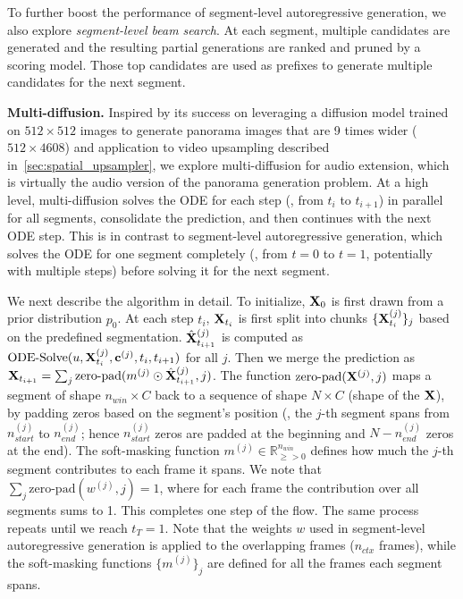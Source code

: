 To further boost the performance of segment-level autoregressive generation, we also explore \textit{segment-level beam search}.
At each segment, multiple candidates are generated and the resulting partial generations are ranked and pruned by a scoring model.
Those top candidates are used as prefixes to generate multiple candidates for the next segment.


\textbf{Multi-diffusion.}
Inspired by its success on leveraging a diffusion model trained on $512 \times 512$ images to generate panorama images that are 9 times wider ($512 \times 4608$) and application to video upsampling described in~\cref{sec:spatial_upsampler},
we explore multi-diffusion for audio extension, which is virtually the audio version of the panorama generation problem.
At a high level, multi-diffusion solves the ODE for each step (\eg, from $t_i$ to $t_{i+1}$) in parallel for all segments,
consolidate the prediction, and then continues with the next ODE step.
This is in contrast to segment-level autoregressive generation,
which solves the ODE for one segment completely (\ie, from $t=0$ to $t=1$, potentially with multiple steps) before solving it for the next segment.

We next describe the algorithm in detail.
To initialize, $\mathbf{X}_0$ is first drawn from a prior distribution $p_0$.
At each step $t_i$, $\mathbf{X}_{t_i}$ is first split into chunks $\{\mathbf{X}_{t_i}^{(j)}\}_j$ based on the predefined segmentation.
$\hat{\mathbf{X}}_{t_{i+1}}^{(j)}$ is computed as $\text{ODE-Solve}(u, \mathbf{X}_{t_i}^{(j)}, \mathbf{c}^{(j)}, t_i, t_{i+1})$ for all $j$.
Then we merge the prediction as $\mathbf{X}_{t_{i+1}} = \sum_j \text{zero-pad}( m^{(j)} \odot \hat{\mathbf{X}}_{t_{i+1}}^{(j)}, j)$.
The function $\text{zero-pad}(\mathbf{X}^{(j)}, j)$ maps a segment of shape $n_{win} \times C$ back to a sequence of shape $N \times C$ (shape of the $\mathbf{X}$),
by padding zeros based on the segment's position (\ie, the $j$-th segment spans from $n_{start}^{(j)}$ to $n_{end}^{(j)}$;
hence $n_{start}^{(j)}$ zeros are padded at the beginning and $N - n_{end}^{(j)}$ zeros at the end). 
The soft-masking function $m^{(j)} \in \mathbb{R}_{\ge> 0}^{n_{win}}$ defines how much the $j$-th segment contributes to each frame it spans.
We note that $\sum_j \text{zero-pad}( w^{(j)}, j ) = 1$, where for each frame the contribution over all segments sums to 1.
This completes one step of the flow.
The same process repeats until we reach $t_T = 1$.
Note that the weights $w$ used in segment-level autoregressive generation is applied to the overlapping frames ($n_{ctx}$ frames), 
while the soft-masking functions $\{ m^{(j)} \}_j$ are defined for all the frames each segment spans.

